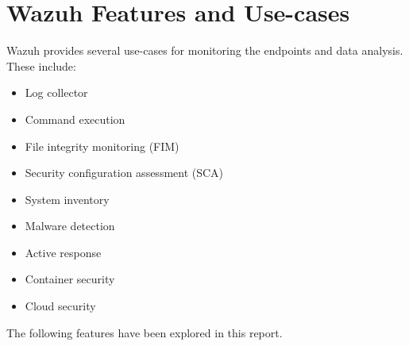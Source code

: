 \newpage
\section{Wazuh Features and Use-cases}

Wazuh provides several use-cases for monitoring the endpoints and data analysis. These include:
\begin{itemize}
\item Log collector
\item Command execution
\item File integrity monitoring (FIM)
\item Security configuration assessment (SCA)
\item System inventory
\item Malware detection
\item Active response
\item Container security
\item Cloud security
\end{itemize}

The following features have been explored in this report.

% 